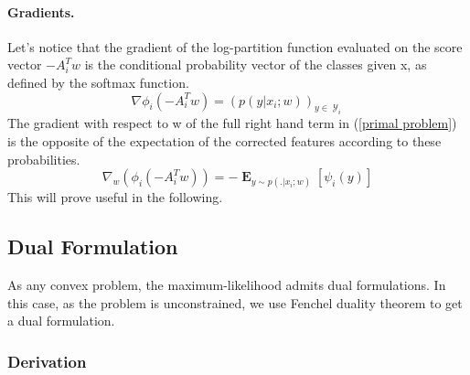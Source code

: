\documentclass{article}
\DeclareMathOperator{\1}{\mathbb{1}}
\DeclareMathOperator{\E}{\mathbf{E}}
\DeclareMathOperator{\Y}{\mathcal{Y}}
\begin{document}
\paragraph{Gradients.}
Let's notice that the gradient of the log-partition function evaluated on the score vector $-A_i^Tw$ is the conditional probability vector of the classes given x, as defined by the softmax function.
\begin{equation}
	\nabla \phi_i(-A_i^Tw) = (p(y | x_i ; w))_{y \in \Y_i}
\end{equation}
The gradient with respect to w of the full right hand term in (\ref{primal problem}) is the opposite of the expectation of the corrected features according to these probabilities.
\begin{equation}
	\label{primal gradient}
	\nabla_w (\phi_i(-A_i^Tw)) = - \E_{y \sim p(. | x_i ; w)} [\psi_i(y)]
\end{equation}
This will prove useful in the following.

\subsection{Dual Formulation}

As any convex problem, the maximum-likelihood admits dual formulations.
In this case, as the problem is unconstrained, we use Fenchel duality theorem to get a dual formulation.

\subsubsection*{Derivation}
\end{document}
